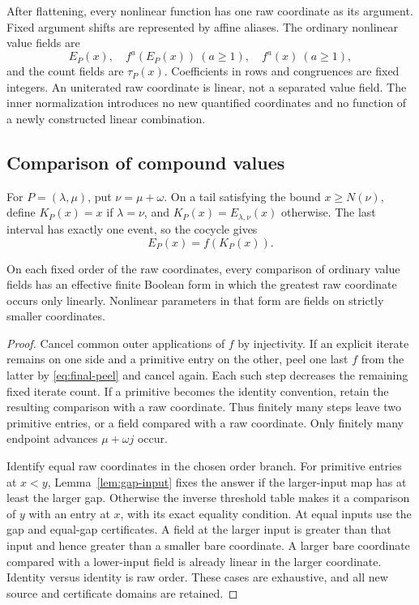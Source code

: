After flattening, every nonlinear function has one raw coordinate as its
argument. Fixed argument shifts are represented by affine aliases. The
ordinary nonlinear value fields are
\[
 E_P(x),\quad f^a(E_P(x))\ (a\ge1),\quad f^a(x)\ (a\ge1),
\]
and the count fields are \(\tau_P(x)\). Coefficients in rows and
congruences are fixed integers. An uniterated raw coordinate is linear,
not a separated value field. The inner normalization introduces no new
quantified coordinates and no function of a newly constructed linear
combination.

\subsection{Comparison of compound values}

For \(P=(\lambda,\mu)\), put \(\nu=\mu+\omega\). On a tail
satisfying the bound \(x\ge N(\nu)\), define \(K_P(x)=x\) if \(\lambda=\nu\),
and \(K_P(x)=E_{\lambda,\nu}(x)\) otherwise. The last interval
has exactly one event, so the cocycle gives
\begin{equation}\label{eq:final-peel}
 E_P(x)=f(K_P(x)).
\end{equation}

\begin{lemma}\label{lem:field-comparison}
On each fixed order of the raw coordinates, every comparison of ordinary
value fields has an effective finite Boolean form in which the greatest
raw coordinate occurs only linearly. Nonlinear parameters in that form
are fields on strictly smaller coordinates.
\end{lemma}
\begin{proof}
Cancel common outer applications of \(f\) by injectivity. If an explicit
iterate remains on one side and a primitive entry on the other, peel one
last \(f\) from the latter by \eqref{eq:final-peel} and cancel again.
Each such step decreases the remaining fixed iterate count. If a primitive
becomes the identity convention, retain the resulting comparison with a
raw coordinate. Thus finitely many steps leave two primitive entries, or
a field compared with a raw coordinate. Only finitely many endpoint
advances \(\mu+\omega j\) occur.

Identify equal raw coordinates in the chosen order branch. For primitive
entries at \(x<y\), Lemma~\ref{lem:gap-input} fixes the answer if the
larger-input map has at least the larger gap. Otherwise the inverse
threshold table makes it a comparison of \(y\) with an entry at \(x\),
with its exact equality condition. At equal inputs use the gap and
equal-gap certificates. A field at the larger input is greater than that
input and hence greater than a smaller bare coordinate. A larger bare
coordinate compared with a lower-input field is already linear in the
larger coordinate. Identity versus identity is raw order. These cases
are exhaustive, and all new source and certificate domains are retained.
\end{proof}

